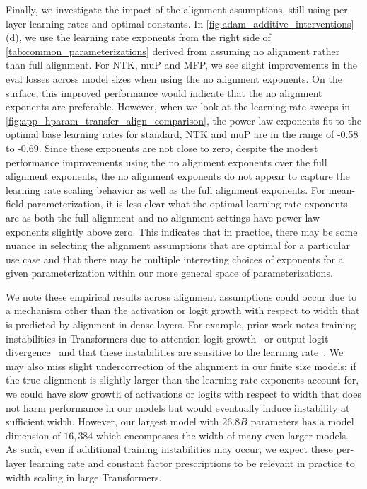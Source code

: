 \documentclass{article}
\theoremstyle{plain}
\theoremstyle{definition}
\theoremstyle{remark}
\begin{document}
Finally, we investigate the impact of the alignment assumptions, still using per-layer learning rates and optimal constants. In \cref{fig:adam_additive_interventions}(d), we use the learning rate exponents from the right side of \cref{tab:common_parameterizations} derived from assuming no alignment rather than full alignment. For NTK, muP and MFP, we see slight improvements in the eval losses across model sizes when using the no alignment exponents. On the surface, this improved performance would indicate that the no alignment exponents are preferable. However, when we look at the learning rate sweeps in \cref{fig:app_hparam_transfer_align_comparison}, the power law exponents fit to the optimal base learning rates for standard, NTK and muP are in the range of -0.58 to -0.69. Since these exponents are not close to zero, despite the modest performance improvements using the no alignment exponents over the full alignment exponents, the no alignment exponents do not appear to capture the learning rate scaling behavior as well as the full alignment exponents. For mean-field parameterization, it is less clear what the optimal learning rate exponents are as both the full alignment and no alignment settings have power law exponents slightly above zero. This indicates that in practice, there may be some nuance in selecting the alignment assumptions that are optimal for a particular use case and that there may be multiple interesting choices of exponents for a given parameterization within our more general space of parameterizations.


We note these empirical results across alignment assumptions could occur due to a mechanism other than the activation or logit growth with respect to width that is predicted by alignment in dense layers. For example, prior work notes training instabilities in Transformers due to attention logit growth~\citep{dehghani2023scaling,zhai2023stabilizing} or output logit divergence~\citep{chowdhery2023palm} and that these instabilities are sensitive to the learning rate~\citep{wortsman2023small}. We may also miss slight undercorrection of the alignment in our finite size models: if the true alignment is slightly larger than the learning rate exponents account for, we could have slow growth of activations or logits with respect to width that does not harm performance in our models but would eventually induce instability at sufficient width. However, our largest model with $26.8B$ parameters has a model dimension of $16{,}384$ which encompasses the width of many even larger models. As such, even if additional training instabilities may occur, we expect these per-layer learning rate and constant factor prescriptions to be relevant in practice to width scaling in large Transformers.
\end{document}
